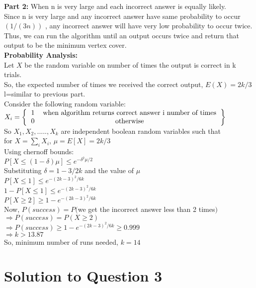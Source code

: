 \documentclass[11pt]{article}
\begin{document}
\textbf{Part 2:} When n is very large and each incorrect answer is equally likely. \\
Since n is very large and any incorrect answer have same probability to occur $(1/(3n))$ , any incorrect answer will have very
low probability to occur twice. Thus, we can run the algorithm until an output occurs twice and return that output to be the minimum 
vertex cover. \\
\textbf{Probability Analysis:} \\
Let $X$ be the random variable on number of times the output is correct in k trials.\\
So, the expected number of times we received the correct output, $E(X) = 2k/3$ l=similar to previous part.  \\
Consider the following random variable: \\
$X_i = \left \{
\begin{tabular}{cc}
1 & when algorithm returns correct answer i number of times \\
0 & otherwise
\end{tabular}
\right \}$ \\
So $X_1, X_2,.....,X_k$ are independent boolean random variables such that \\
for $X = \sum_{i} X_i$, $\mu = E[X] = 2k/3$ \\
Using chernoff bounds: \\
$P[X \leq (1-\delta)\mu] \leq e^{-\delta^2 \mu/2}$ \\
Substituting $\delta = 1-3/2k$ and the value of $\mu$ \\
$P[X \leq 1] \leq e^{-(2k-3)^2/6k}$ \\
$1 - P[X \leq 1] \leq e^{-(2k-3)^2/6k}$ \\
$P[X \geq 2] \geq 1 - e^{-(2k-3)^2/6k}$ \\
Now, $P(success) = P($we get the incorrect answer less than 2 times$)$ \\
$\Rightarrow P(success) = P(X \geq 2)$ \\
$\Rightarrow P(success) \geq 1 - e^{-(2k-3)^2/6k} \geq 0.999$ \\
$\Rightarrow k > 13.87$ \\
So, minimum number of runs needed, $k = 14$

\newpage

\section{Solution to Question 3}
\end{document}
